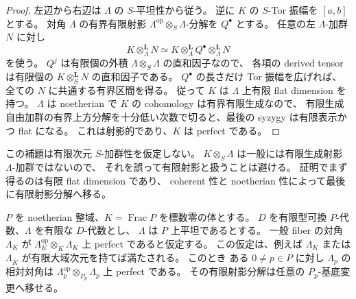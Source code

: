 \begin{proof}
左辺から右辺は $\Lambda$ の $S$-平坦性から従う。
逆に $K$ の $S$-Tor 振幅を $[a,b]$ とする。
対角 $\Lambda$ の有界有限射影
$\Lambda^{\mathrm{op}}\otimes_S\Lambda$-分解を $Q^\bullet$ とする。
任意の左 $\Lambda$-加群 $N$ に対し
\[
 K\otimes_\Lambda^{\mathbf L}N
 \simeq K\otimes_\Lambda^{\mathbf L}Q^\bullet
              \otimes_\Lambda^{\mathbf L}N
\]
を使う。
$Q^j$ は有限個の外積 $\Lambda\otimes_S\Lambda$ の直和因子なので、
各項の derived tensor は有限個の
$K\otimes_S^{\mathbf L}N$ の直和因子である。
$Q^\bullet$ の長さだけ Tor 振幅を広げれば、全ての $N$ に共通する有界区間を得る。
従って $K$ は $\Lambda$ 上有限 flat dimension を持つ。
$\Lambda$ は noetherian で $K$ の cohomology は有界有限生成なので、
有限生成自由加群の有界上方分解を十分低い次数で切ると、最後の syzygy は有限表示かつ flat になる。
これは射影的であり、$K$ は perfect である。
\end{proof}

この補題は有限次元 $S$-加群性を仮定しない。
$K\otimes_S\Lambda$ は一般には有限生成射影 $\Lambda$-加群ではないので、
それを誤って有限射影と扱うことは避ける。
証明でまず得るのは有限 flat dimension であり、
coherent 性と noetherian 性によって最後に有限射影分解へ移る。

\begin{lemma}
\label{lem:relative-diagonal-generic-spread}
$P$ を noetherian 整域、$K=\operatorname{Frac}P$ を標数零の体とする。
$D$ を有限型可換 $P$-代数、$\Lambda$ を有限な $D$-代数とし、
$\Lambda$ は $P$ 上平坦であるとする。
一般 fiber の対角 $\Lambda_K$ が
$\Lambda_K^{\mathrm{op}}\otimes_K\Lambda_K$ 上 perfect であると仮定する。
この仮定は、例えば $\Lambda_K$ または $\Lambda_{\overline K}$ が有限大域次元を持てば満たされる。
このとき
ある $0\ne p\in P$ に対し $\Lambda_p$ の相対対角は
$\Lambda_p^{\mathrm{op}}\otimes_{P_p}\Lambda_p$ 上 perfect である。
その有限射影分解は任意の $P_p$-基底変更へ移せる。
\end{lemma}

